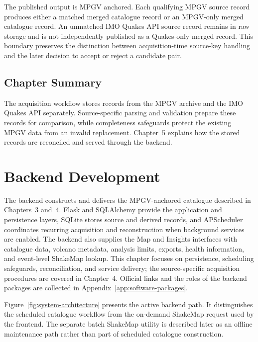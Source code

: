 \documentclass[12pt]{article}
\begin{document}
The published output is MPGV anchored. Each qualifying MPGV source record produces either a matched merged catalogue record or an MPGV-only merged catalogue record. An unmatched IMO Quakes API source record remains in raw storage and is not independently published as a Quakes-only merged record. This boundary preserves the distinction between acquisition-time source-key handling and the later decision to accept or reject a candidate pair.

\subsection{Chapter Summary}
\label{subsec:acquisition-summary}

The acquisition workflow stores records from the MPGV archive and the IMO Quakes API separately. Source-specific parsing and validation prepare these records for comparison, while completeness safeguards protect the existing MPGV data from an invalid replacement. Chapter~5 explains how the stored records are reconciled and served through the backend.

\newpage


\section{Backend Development}

The backend constructs and delivers the MPGV-anchored catalogue described in Chapters~3 and~4. Flask and SQLAlchemy provide the application and persistence layers, SQLite stores source and derived records, and APScheduler coordinates recurring acquisition and reconstruction when background services are enabled. The backend also supplies the Map and Insights interfaces with catalogue data, volcano metadata, analysis limits, exports, health information, and event-level ShakeMap lookup. This chapter focuses on persistence, scheduling safeguards, reconciliation, and service delivery; the source-specific acquisition procedures are covered in Chapter~4. Official links and the roles of the backend packages are collected in Appendix~\ref{app:software-packages}.

Figure~\ref{fig:system-architecture} presents the active backend path. It distinguishes the scheduled catalogue workflow from the on-demand ShakeMap request used by the frontend. The separate batch ShakeMap utility is described later as an offline maintenance path rather than part of scheduled catalogue construction.
\end{document}
